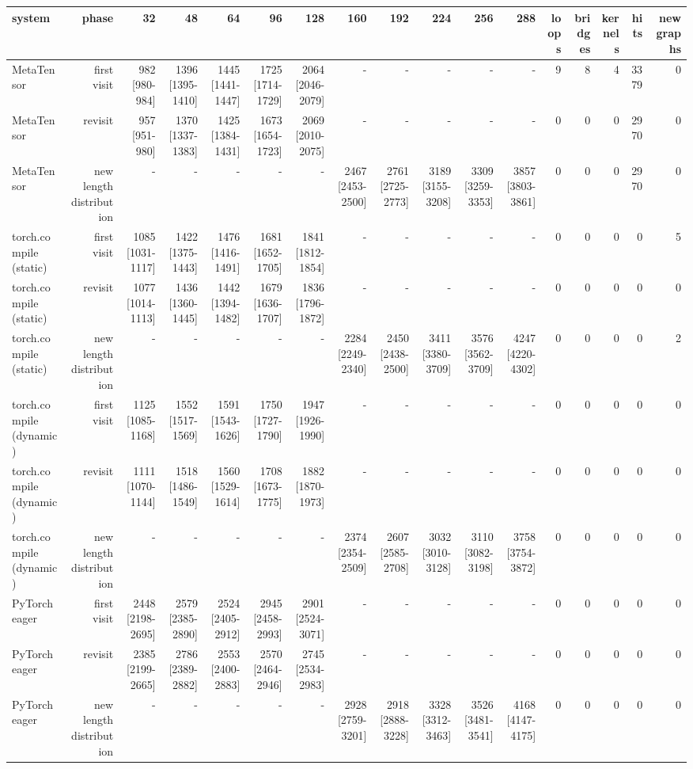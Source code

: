 \begin{tabular}{lrrrrrrrrrrrrrrrr}
\toprule
system & phase & 32 & 48 & 64 & 96 & 128 & 160 & 192 & 224 & 256 & 288 & loops & bridges & kernels & hits & new graphs \\
\midrule
MetaTensor & first visit & 982 [980-984] & 1396 [1395-1410] & 1445 [1441-1447] & 1725 [1714-1729] & 2064 [2046-2079] & - & - & - & - & - & 9 & 8 & 4 & 3379 & 0 \\
MetaTensor & revisit & 957 [951-980] & 1370 [1337-1383] & 1425 [1384-1431] & 1673 [1654-1723] & 2069 [2010-2075] & - & - & - & - & - & 0 & 0 & 0 & 2970 & 0 \\
MetaTensor & new length distribution & - & - & - & - & - & 2467 [2453-2500] & 2761 [2725-2773] & 3189 [3155-3208] & 3309 [3259-3353] & 3857 [3803-3861] & 0 & 0 & 0 & 2970 & 0 \\
torch.compile (static) & first visit & 1085 [1031-1117] & 1422 [1375-1443] & 1476 [1416-1491] & 1681 [1652-1705] & 1841 [1812-1854] & - & - & - & - & - & 0 & 0 & 0 & 0 & 5 \\
torch.compile (static) & revisit & 1077 [1014-1113] & 1436 [1360-1445] & 1442 [1394-1482] & 1679 [1636-1707] & 1836 [1796-1872] & - & - & - & - & - & 0 & 0 & 0 & 0 & 0 \\
torch.compile (static) & new length distribution & - & - & - & - & - & 2284 [2249-2340] & 2450 [2438-2500] & 3411 [3380-3709] & 3576 [3562-3709] & 4247 [4220-4302] & 0 & 0 & 0 & 0 & 2 \\
torch.compile (dynamic) & first visit & 1125 [1085-1168] & 1552 [1517-1569] & 1591 [1543-1626] & 1750 [1727-1790] & 1947 [1926-1990] & - & - & - & - & - & 0 & 0 & 0 & 0 & 0 \\
torch.compile (dynamic) & revisit & 1111 [1070-1144] & 1518 [1486-1549] & 1560 [1529-1614] & 1708 [1673-1775] & 1882 [1870-1973] & - & - & - & - & - & 0 & 0 & 0 & 0 & 0 \\
torch.compile (dynamic) & new length distribution & - & - & - & - & - & 2374 [2354-2509] & 2607 [2585-2708] & 3032 [3010-3128] & 3110 [3082-3198] & 3758 [3754-3872] & 0 & 0 & 0 & 0 & 0 \\
PyTorch eager & first visit & 2448 [2198-2695] & 2579 [2385-2890] & 2524 [2405-2912] & 2945 [2458-2993] & 2901 [2524-3071] & - & - & - & - & - & 0 & 0 & 0 & 0 & 0 \\
PyTorch eager & revisit & 2385 [2199-2665] & 2786 [2389-2882] & 2553 [2400-2883] & 2570 [2464-2946] & 2745 [2534-2983] & - & - & - & - & - & 0 & 0 & 0 & 0 & 0 \\
PyTorch eager & new length distribution & - & - & - & - & - & 2928 [2759-3201] & 2918 [2888-3228] & 3328 [3312-3463] & 3526 [3481-3541] & 4168 [4147-4175] & 0 & 0 & 0 & 0 & 0 \\
\bottomrule
\end{tabular}
